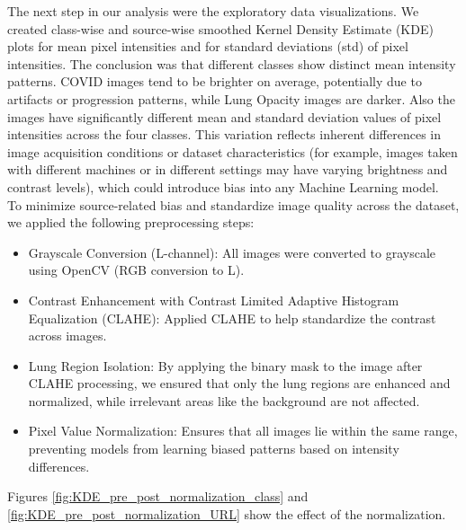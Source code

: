 \documentclass{article}
\begin{document}
The next step in our analysis were the exploratory data visualizations. We created class-wise and source-wise smoothed Kernel Density Estimate (KDE) plots for mean pixel intensities and for standard deviations (std) of pixel intensities. The conclusion was that different classes show distinct mean intensity patterns. COVID images tend to be brighter on average, potentially due to artifacts or progression patterns, while Lung Opacity images are darker. Also the images have significantly different mean and standard deviation values of pixel intensities across the four classes. This variation reflects inherent differences in image acquisition conditions or dataset characteristics (for example, images taken with different machines or in different settings may have varying brightness and contrast levels), which could introduce bias into any Machine Learning model.\\
To minimize source-related bias and standardize image quality across the dataset, we applied the following preprocessing steps:
\begin{itemize}
    \item Grayscale Conversion (L-channel): All images were converted to grayscale using OpenCV (RGB conversion to L).
    \item Contrast Enhancement with Contrast Limited Adaptive Histogram Equalization (CLAHE): Applied CLAHE to help standardize the contrast across images.
    \item Lung Region Isolation: By applying the binary mask to the image after CLAHE processing, we ensured that only the lung regions are enhanced and normalized, while irrelevant areas like the background are not affected.
     \item Pixel Value Normalization: Ensures that all images lie within the same range, preventing models from learning biased patterns based on intensity differences.
\end{itemize}

Figures \ref{fig:KDE_pre_post_normalization_class} and \ref{fig:KDE_pre_post_normalization_URL} show the effect of the normalization. 
\end{document}
